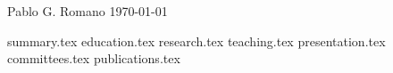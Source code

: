 \documentclass[11pt, a4paper]{awesome-cv}
\newcommand*{\sectiondir}{./sections/}
\begin{document}
\makecvheader[C]

\makecvfooter
  {Pablo G. Romano}
  {\thepage}
  {\today}

{summary.tex}
{education.tex}
{research.tex}
{teaching.tex}
{presentation.tex}
{committees.tex}
{publications.tex}
\end{document}
